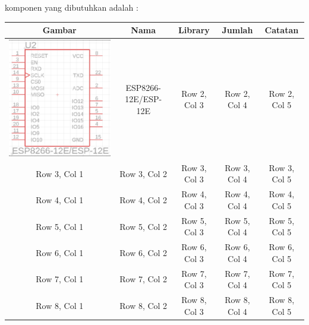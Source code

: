 \begin{enumerate}
\begin{figure}[H]
        \end{figure}
    komponen yang dibutuhkan adalah :
    \begin{center}
        \begin{tabular}[H]
            {|c|c|c|c|c|}
            \hline
            Gambar & Nama & Library & Jumlah & Catatan \\
            \hline
            \includegraphics[width=0.3\linewidth]{P1/img/ESP8266.png} & ESP8266-
    12E/ESP-12E & Row 2, Col 3 & Row 2, Col 4 & Row 2, Col 5 \\
            \hline
            Row 3, Col 1 & Row 3, Col 2 & Row 3, Col 3 & Row 3, Col 4 & Row 3, Col 5 \\
            \hline
            Row 4, Col 1 & Row 4, Col 2 & Row 4, Col 3 & Row 4, Col 4 & Row 4, Col 5 \\
            \hline
            Row 5, Col 1 & Row 5, Col 2 & Row 5, Col 3 & Row 5, Col 4 & Row 5, Col 5 \\
            \hline
            Row 6, Col 1 & Row 6, Col 2 & Row 6, Col 3 & Row 6, Col 4 & Row 6, Col 5 \\
            \hline
            Row 7, Col 1 & Row 7, Col 2 & Row 7, Col 3 & Row 7, Col 4 & Row 7, Col 5 \\
            \hline
            Row 8, Col 1 & Row 8, Col 2 & Row 8, Col 3 & Row 8, Col 4 & Row 8, Col 5 \\
            \hline
            \end{tabular}
    \end{center}
    


\end{enumerate}
